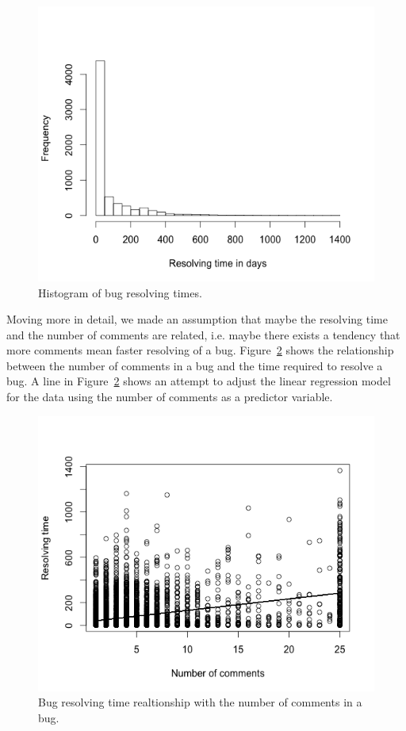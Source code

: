 \documentclass[a4paper,11pt]{report}
\begin{document}
\begin{figure}[ht!]
\centering
\includegraphics[width=.7\textwidth]{../diagrams/resolving_times.png}
\caption{Histogram of bug resolving times.}
\label{fig:res_times}
\end{figure}
 
Moving more in detail, we made an assumption that maybe the resolving time and the number of comments are related, i.e. maybe there exists a tendency that more comments mean faster resolving of a bug. Figure~\ref{fig:com_time} shows the relationship between the number of comments in a bug and the time required to resolve a bug. A line in Figure~\ref{fig:com_time} shows an attempt to adjust the linear regression model for the data using the number of comments as a predictor variable.

\begin{figure}[ht!]
\centering
\includegraphics[width=.7\textwidth]{../diagrams/comments_time.png}
\caption{Bug resolving time realtionship with the number of comments in a bug.}
\label{fig:com_time}
\end{figure}
\end{document}
